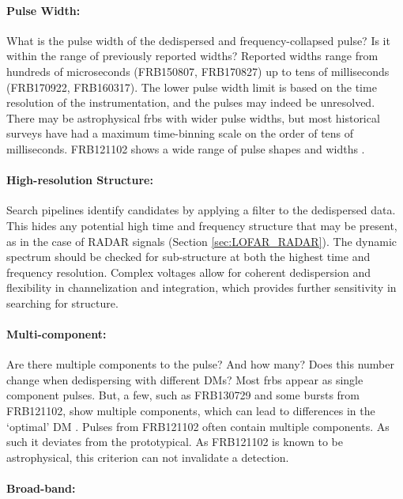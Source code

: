 \documentclass[a4paper,fleqn,usenatbib]{mnras}
\begin{document}
\paragraph{Pulse Width:}

What is the pulse width of the dedispersed and frequency-collapsed pulse? Is it
within the range of previously reported widths? Reported widths range from
hundreds of microseconds (FRB150807, FRB170827) up to tens of milliseconds
(FRB170922, FRB160317). The lower pulse width limit is based on the time
resolution of the instrumentation, and the pulses may indeed be unresolved.
There may be astrophysical \glspl{frb} with wider pulse widths, but most
historical surveys have had a maximum time-binning scale on the order of tens of
milliseconds. FRB121102 shows a wide range of pulse shapes and widths
\citep{2018Natur.553..182M,atel10675}.

\paragraph{High-resolution Structure:}

Search pipelines identify candidates by applying a filter to the dedispersed
data. This hides any potential high time and frequency structure that may be
present, as in the case of RADAR signals (Section \ref{sec:LOFAR_RADAR}). The
dynamic spectrum should be checked for sub-structure at both the highest time
and frequency resolution. Complex voltages allow for coherent dedispersion and
flexibility in channelization and integration, which provides further
sensitivity in searching for structure.

\paragraph{Multi-component:}

Are there multiple components to the pulse? And how many? Does this number
change when dedispersing with different DMs? Most \glspl{frb} appear as single
component pulses. But, a few, such as FRB130729 and some bursts from FRB121102,
show multiple components, which can lead to differences in the `optimal' DM
\citep{2018Natur.553..182M}. Pulses from FRB121102 often contain multiple
components. As such it deviates from the prototypical. As FRB121102 is known to
be astrophysical, this criterion can not invalidate a detection.

\paragraph{Broad-band:}
\end{document}
